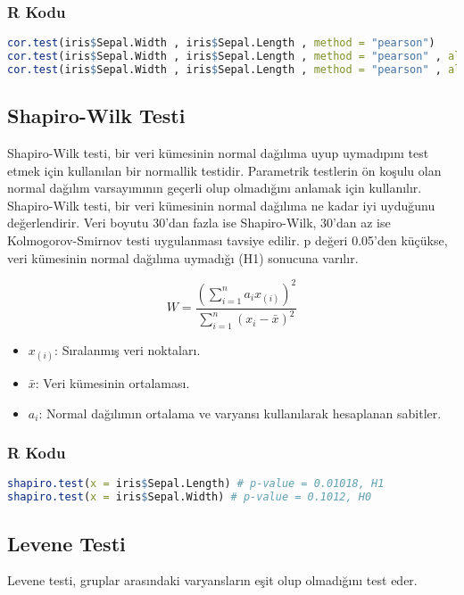 \subsubsection{R Kodu}

\begin{lstlisting}[language=R]
cor.test(iris$Sepal.Width , iris$Sepal.Length , method = "pearson")
cor.test(iris$Sepal.Width , iris$Sepal.Length , method = "pearson" , alternative = "less")
cor.test(iris$Sepal.Width , iris$Sepal.Length , method = "pearson" , alternative = "greater")
\end{lstlisting}

\newpage

\subsection{Shapiro-Wilk Testi}
Shapiro-Wilk testi, bir veri kümesinin normal dağılıma uyup uymadıpını test etmek için kullanılan bir normallik testidir. Parametrik testlerin ön koşulu olan normal dağılım varsayımının geçerli olup olmadığını anlamak için kullanılır. Shapiro-Wilk testi, bir veri kümesinin normal dağılıma ne kadar iyi uyduğunu değerlendirir. Veri boyutu 30'dan fazla ise Shapiro-Wilk, 30'dan az ise Kolmogorov-Smirnov testi uygulanması tavsiye edilir. p değeri 0.05'den küçükse, veri kümesinin normal dağılıma uymadığı (H1) sonucuna varılır.

\[
W = \frac{\left( \sum_{i=1}^{n} a_i x_{(i)} \right)^2}{\sum_{i=1}^{n} (x_i - \bar{x})^2}
\]

\begin{itemize}
	\item $x_(i)$: Sıralanmış veri noktaları.
	\item $\bar{x}$: Veri kümesinin ortalaması.
	\item $a_i$: Normal dağılımın ortalama ve varyansı kullanılarak hesaplanan sabitler.
\end{itemize}

\subsubsection{R Kodu}

\begin{lstlisting}[language=R]
shapiro.test(x = iris$Sepal.Length) # p-value = 0.01018, H1
shapiro.test(x = iris$Sepal.Width) # p-value = 0.1012, H0
\end{lstlisting}

\newpage

\subsection{Levene Testi}
Levene testi, gruplar arasındaki varyansların eşit olup olmadığını test eder.

